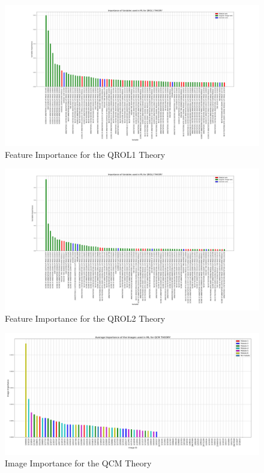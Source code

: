 \documentclass[a4paper,11pt]{report}
\numberwithin{figure}{section} %
\begin{document}
      \begin{figure}[H]
      \centering
      \includegraphics[width=.95\linewidth]{var_importance_QROL1_THEORY_2018-05-02_20_54_23.png}
      \caption{Feature Importance for the QROL1 Theory}
      \label{fig:var_th2}
      \end{figure}
      
      \begin{figure}[H]
      \centering
      \includegraphics[width=.95\linewidth]{var_importance_QROL2_THEORY_2018-05-02_20_53_44.png}
      \caption{Feature Importance for the QROL2 Theory}
      \label{fig:var_th3}
      \end{figure}    


     \begin{figure}[H]
      \centering
      \includegraphics[width=.95\linewidth]{im_importance_QCM_THEORY_2018-05-02_20_53_22.png}
      \caption{Image Importance for the QCM Theory}
      \label{fig:im_th1}
      \end{figure}
      
\end{document}
